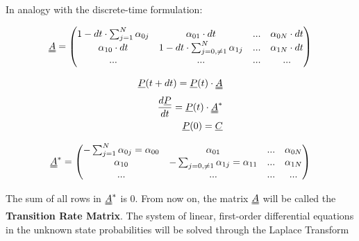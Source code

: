 \documentclass[8pt, landscape, fleqn]{scrartcl}
\begin{document}
\begin{multicols*}{3}
In analogy with the discrete-time formulation:

\begin{equation}
    \uuline{A} = \begin{pmatrix}
        1-dt\cdot \sum_{j=1}^{N} \alpha_{0j} & \alpha_{01} \cdot dt & ... & \alpha_{0N} \cdot dt \\
        \alpha_{10}\cdot dt & 1-dt\cdot \sum_{j=0, \neq 1}^{N} \alpha_{1j} & ... & \alpha_{1N} \cdot dt \\
        ... & ... & ...& ...
    \end{pmatrix}
\end{equation}

\begin{align}
    \underline{P}(t+dt) = \underline{P}(t)\cdot \uuline{A} \\
    \frac{d\underline{P}}{dt} = \underline{P}(t) \cdot \uuline{A}^* \\
    \underline{P}(0) = \underline{C}
\end{align}

\begin{equation}
    \uuline{A}^* = \begin{pmatrix}
        -\sum_{j=1}^N \alpha_{0j} = \alpha_{00} & \alpha_{01} & ... &  \alpha_{0N} \\
        \alpha_{10} & -\sum_{j=0, \neq 1} \alpha_{1j}= \alpha_{11} & ... & \alpha_{1N} \\
        ... & ... & ... & ...
    \end{pmatrix}
\end{equation}

The sum of all rows in $\uuline{A}^*$ is $0$. From now on, the matrix $\uuline{A}$ will be called the \textbf{Transition Rate Matrix}. The system of linear, first-order differential equations in the unknown state probabilities will be solved through the Laplace Transform


\end{multicols*}
\end{document}
